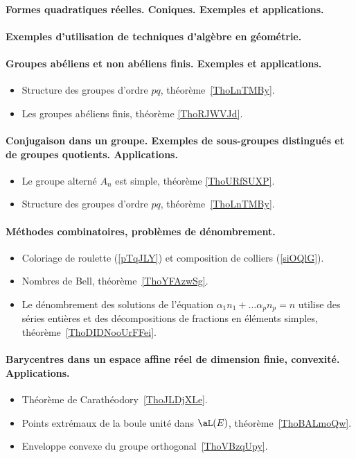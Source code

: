 \paragraph{Formes quadratiques réelles. Coniques. Exemples et applications.}
\paragraph{Exemples d'utilisation de techniques d'algèbre en géométrie.}



\paragraph{Groupes abéliens et non abéliens finis. Exemples et applications.}
\begin{itemize}
    \item Structure des groupes d'ordre \( pq\), théorème~\ref{ThoLnTMBy}.
    \item Les groupes abéliens finis, théorème \ref{ThoRJWVJd}.
\end{itemize}
\paragraph{Conjugaison dans un groupe. Exemples  de  sous-groupes  distingués  et de groupes quotients. Applications.}
\begin{itemize}
    \item Le groupe alterné \( A_n\) est simple, théorème \ref{ThoURfSUXP}.
    \item Structure des groupes d'ordre \( pq\), théorème~\ref{ThoLnTMBy}.
\end{itemize}
\paragraph{Méthodes combinatoires, problèmes de dénombrement.}
\begin{itemize}
    \item Coloriage de roulette (\ref{pTqJLY}) et composition de colliers (\ref{siOQlG}).
    \item Nombres de Bell, théorème~\ref{ThoYFAzwSg}.
    \item Le dénombrement des solutions de l'équation \( \alpha_1 n_1+\ldots \alpha_pn_p=n\) utilise des séries entières et des décompositions de fractions en éléments simples, théorème~\ref{ThoDIDNooUrFFei}.
\end{itemize}
\paragraph{Barycentres dans un espace affine réel de dimension finie, convexité. Applications.}
\begin{itemize}
    \item Théorème de Carathéodory~\ref{ThoJLDjXLe}.
    \item Points extrémaux de la boule unité dans \( \aL(E)\), théorème~\ref{ThoBALmoQw}.
    \item Enveloppe convexe du groupe orthogonal~\ref{ThoVBzqUpy}.
\end{itemize}
